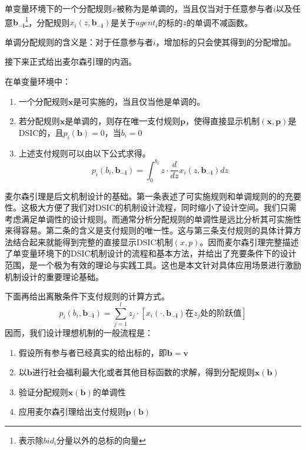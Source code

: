 \documentclass[promaster]{thesis-uestc}
\begin{document}
\begin{definition}[单调分配规则]
    单变量环境下的一个分配规则$x$被称为是单调的，当且仅当对于任意参与者$i$以及任意$\mathbf{b_{-i}}$\footnote{表示除$bid_i$分量以外的总标的向量}，分配规则$x_i(z,\mathbf{b_{-i}})$是关于$agent_i$的标的$z$的单调不减函数。
\end{definition}
单调分配规则的含义是：对于任意参与者$i$，增加标的只会使其得到的分配增加。

接下来正式给出麦尔森引理的内涵。
\begin{theorem}[麦尔森引理]
    在单变量环境中：
    \begin{enumerate}
        \item 一个分配规则$\mathbf{x}$是可实施的，当且仅当他是单调的。
        \item 若分配规则$\mathbf{x}$是单调的，则存在唯一支付规则$\mathbf{p}$，使得直接显示机制$\mathbf{(x,p)}$是DSIC的，且$p_i(\mathbf{b})=0$，当$b_i=0$
        \item 上述支付规则可以由以下公式求得。
        $$p_i(b_i,\mathbf{b_{-i}})=\int_0^{b_i}{z\cdot\frac{d}{dz}x_i(z,\mathbf{b_{-i}})dz}$$
    \end{enumerate}
\end{theorem}

麦尔森引理是后文机制设计的基础。第一条表述了可实施规则和单调规则的的充要性。这极大方便了我们对DSIC的机制设计流程，同时缩小了设计空间。我们只需考虑满足单调性的设计规则。而通常分析分配规则的单调性是远比分析其可实施性来得容易。第二条的含义是支付规则的唯一性。这与第三条支付规则的具体计算方法结合起来就能得到完整的直接显示DSIC机制$(x,p)$。因而麦尔森引理完整描述了单变量环境下的DSIC机制设计的流程和基本方法，并给出了充要条件下的设计范围，是一个极为有效的理论与实践工具。这也是本文针对具体应用场景进行激励机制设计的重要理论基础。

下面再给出离散条件下支付规则的计算方式。
\begin{equation}
\label{myersonlisan}
p_i(b_i,\mathbf{b_{-i}})=\sum_{j=1}^l{z_j\cdot[x_i(\cdot,\mathbf{b_{-i}})\text{在}z_j\text{处的阶跃值}]}
\end{equation}
因而，我们设计理想机制的一般流程是：
\begin{enumerate}
    \item 假设所有参与者已经真实的给出标的，即$\mathbf{b} = \mathbf{v}$
    \item 以$\mathbf{b}$进行社会福利最大化或者其他目标函数的求解，得到分配规则$\mathbf{x(b)}$
    \item 验证分配规则$\mathbf{x(b)}$的单调性
    \item 应用麦尔森引理给出支付规则$\mathbf{p(b)}$
\end{enumerate}
\end{document}
